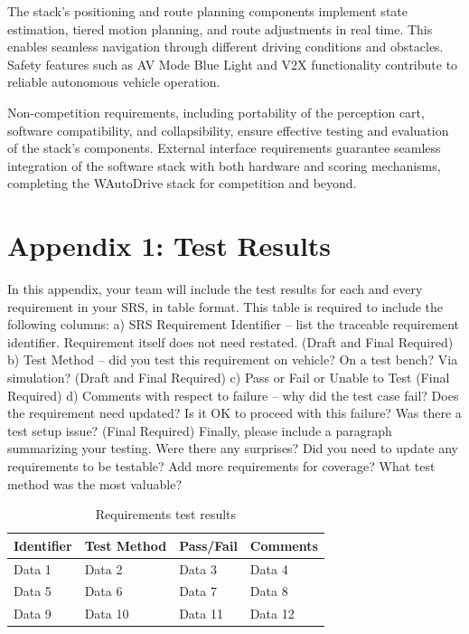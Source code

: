 \documentclass[12pt]{article}
\begin{document}
The stack's positioning and route planning components implement state estimation, tiered motion planning, and route adjustments in real time. This enables seamless navigation through different driving conditions and obstacles. Safety features such as AV Mode Blue Light and V2X functionality contribute to reliable autonomous vehicle operation.

Non-competition requirements, including portability of the perception cart, software compatibility, and collapsibility, ensure effective testing and evaluation of the stack's components. External interface requirements guarantee seamless integration of the software stack with both hardware and scoring mechanisms, completing the WAutoDrive stack for competition and beyond. 

\section{Appendix 1: Test Results}
In this appendix, your team will include the test results for each and every requirement in your SRS, in
table format. This table is required to include the following columns:
a) SRS Requirement Identifier – list the traceable requirement identifier. Requirement itself does
not need restated. (Draft and Final Required)
b) Test Method – did you test this requirement on vehicle? On a test bench? Via simulation?
(Draft and Final Required)
c) Pass or Fail or Unable to Test (Final Required)
d) Comments with respect to failure – why did the test case fail? Does the requirement need
updated? Is it OK to proceed with this failure? Was there a test setup issue? (Final Required)
Finally, please include a paragraph summarizing your testing. Were there any surprises? Did you need
to update any requirements to be testable? Add more requirements for coverage? What test method
was the most valuable?

\begin{table}[h!]
\centering
\begin{tabularx}{\textwidth}{|X|X|X|X|}
\hline
Identifier & Test Method & Pass/Fail & Comments \\ \hline
Data 1   & Data 2   & Data 3   & Data 4   \\ \hline
Data 5   & Data 6   & Data 7   & Data 8   \\ \hline
Data 9   & Data 10  & Data 11  & Data 12  \\ \hline
\end{tabularx}
\caption{Requirements test results}
\label{tab:four-column-table}
\end{table}
\end{document}
